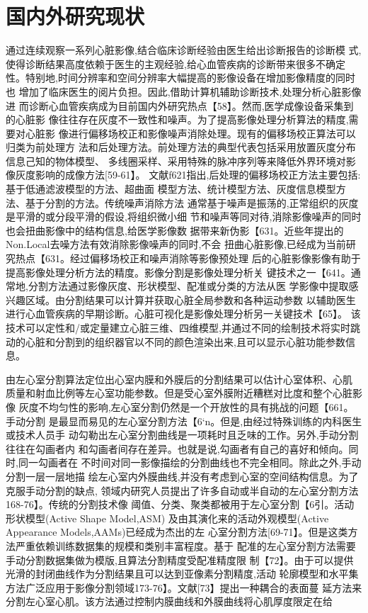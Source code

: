 \section{国内外研究现状}

通过连续观察一系列心脏影像,结合临床诊断经验由医生给出诊断报告的诊断模
式,使得诊断结果高度依赖于医生的主观经验,给心血管疾病的诊断带来很多不确定
性。特别地,时间分辨率和空间分辨率大幅提高的影像设备在增加影像精度的同时也
增加了临床医生的阅片负担。因此,借助计算机辅助诊断技术,处理分析心脏影像进
而诊断心血管疾病成为目前国内外研究热点【58】。然而,医学成像设备采集到的心脏影
像往往存在灰度不一致性和噪声。为了提高影像处理分析算法的精度,需要对心脏影
像进行偏移场校正和影像噪声消除处理。现有的偏移场校正算法可以归类为前处理方
法和后处理方法。前处理方法的典型代表包括采用放置灰度分布信息己知的物体模型、
多线圈采样、采用特殊的脉冲序列等来降低外界环境对影像灰度影响的成像方法[59-61】。
文献f621指出,后处理的偏移场校正方法主要包括:基于低通滤波模型的方法、超曲面
模型方法、统计模型方法、灰度信息模型方法、基于分割的方法。传统噪声消除方法
通常基于噪声是振荡的,正常组织的灰度是平滑的或分段平滑的假设,将组织微小细
节和噪声等同对待,消除影像噪声的同时也会扭曲影像中的结构信息,给医学影像数
据带来新伪影【631。近些年提出的Non.Local去噪方法有效消除影像噪声的同时,不会
扭曲心脏影像,已经成为当前研究热点【631。经过偏移场校正和噪声消除等影像预处理
后的心脏影像影像有助于提高影像处理分析方法的精度。影像分割是影像处理分析关
键技术之一【641。通常地,分割方法通过影像灰度、形状模型、配准或分类的方法从医
学影像中提取感兴趣区域。由分割结果可以计算并获取心脏全局参数和各种运动参数
以辅助医生进行心血管疾病的早期诊断。心脏可视化是影像处理分析另一关键技术【65】。
该技术可以定性和/或定量建立心脏三维、四维模型,并通过不同的绘制技术将实时跳
动的心脏和分割到的组织器官以不同的颜色渲染出来,且可以显示心脏功能参数信息。


由左心室分割算法定位出心室内膜和外膜后的分割结果可以估计心室体积、心肌
质量和射血比例等左心室功能参数。但是受心室外膜附近糟糕对比度和整个心脏影像
灰度不均匀性的影响,左心室分割仍然是一个开放性的具有挑战的问题【661。手动分割
是最显而易见的左心室分割方法【6‘n。但是,由经过特殊训练的内科医生或技术人员手
动勾勒出左心室分割曲线是一项耗时且乏味的工作。另外,手动分割往往在勾画者内
和勾画者间存在差异。也就是说,勾画者有自己的喜好和倾向。同时,同一勾画者在
不时间对同一影像描绘的分割曲线也不完全相同。除此之外,手动分割一层一层地描
绘左心室内外膜曲线,并没有考虑到心室的空间结构信息。为了克服手动分割的缺点,
领域内研究人员提出了许多自动或半自动的左心室分割方法168-76】。传统的分割技术像
阈值、分类、聚类都被用于左心室分割【6引。活动形状模型(Active
 Shape Model,ASM)
 及由其演化来的活动外观模型(Active
  Appearance
   Models,AAMs)已经成为杰出的左
   心室分割方法[69-71】。但是这类方法严重依赖训练数据集的规模和类别丰富程度。基于
   配准的左心室分割方法需要手动分割数据集做为模版,且算法分割精度受配准精度限
   制【72】。由于可以提供光滑的封闭曲线作为分割结果且可以达到亚像素分割精度,活动
   轮廓模型和水平集方法广泛应用于影像分割领域173-76】。文献[73】提出一种耦合的表面蔓
   延方法来分割左心室心肌。该方法通过控制内膜曲线和外膜曲线将心肌厚度限定在给

